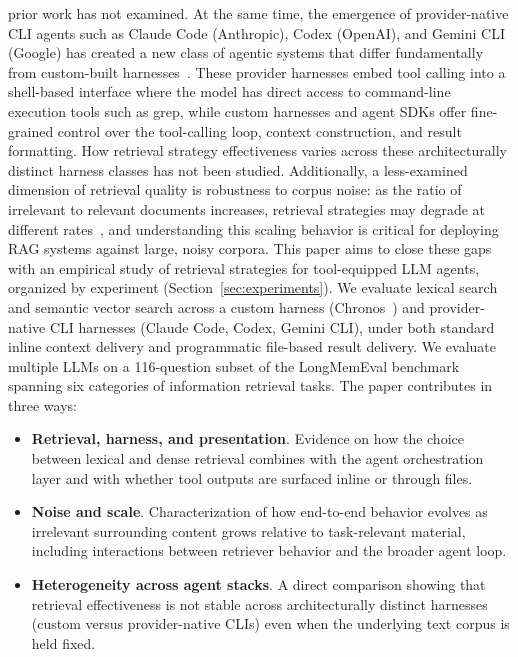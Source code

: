 \documentclass[sigconf,nonacm]{acmart}
\begin{document}
  prior work has not examined.
  At the same time, the emergence of provider-native CLI agents such as Claude Code (Anthropic),
  Codex (OpenAI), and Gemini CLI (Google) has created a new class of agentic systems that differ
  fundamentally from custom-built harnesses~\cite{yang2024sweagent}. These provider harnesses
  embed tool calling into a shell-based interface where the model has direct access to command-line execution tools such as grep, while custom harnesses and agent SDKs offer fine-grained control over the tool-calling
  loop, context construction, and result formatting. How retrieval strategy effectiveness varies
  across these architecturally distinct harness classes has not been studied. Additionally, a
  less-examined dimension of retrieval quality is robustness to corpus noise: as the ratio of
  irrelevant to relevant documents increases, retrieval strategies may degrade at different
  rates~\cite{liu2023lostinmiddle}, and understanding this scaling behavior is critical for
  deploying RAG systems against large, noisy corpora.
  This paper aims to close these gaps with an empirical study of retrieval strategies for
  tool-equipped LLM agents, organized by experiment (Section~\ref{sec:experiments}). We evaluate
   lexical search and semantic vector search across a custom harness (Chronos~\cite{chronos}) and
   provider-native CLI harnesses (Claude Code, Codex, Gemini CLI), under both standard inline
  context delivery and programmatic file-based result delivery. We evaluate multiple LLMs on a
  116-question subset of the LongMemEval benchmark~\cite{longmemeval} spanning six categories of
  information retrieval tasks. The paper contributes in three ways:
  \begin{itemize}
    \item \textbf{Retrieval, harness, and presentation}. Evidence on how the choice between
  lexical and dense retrieval combines with the agent orchestration layer and with whether tool
  outputs are surfaced inline or through files.
    \item \textbf{Noise and scale}. Characterization of how end-to-end behavior evolves as
  irrelevant surrounding content grows relative to task-relevant material, including interactions
   between retriever behavior and the broader agent loop.
    \item \textbf{Heterogeneity across agent stacks}. A direct comparison showing that retrieval
  effectiveness is not stable across architecturally distinct harnesses (custom versus
  provider-native CLIs) even when the underlying text corpus is held fixed.
  \end{itemize}
\end{document}
